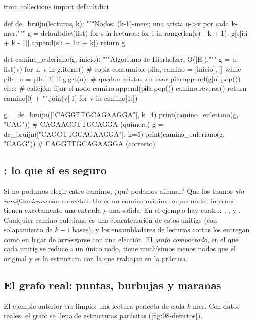 \begin{codigo}[de\_bruijn.py]
from collections import defaultdict

def de_bruijn(lecturas, k):
    """Nodos: (k-1)-mers; una arista u->v por cada k-mer."""
    g = defaultdict(list)
    for s in lecturas:
        for i in range(len(s) - k + 1):
            g[s[i:i + k - 1]].append(s[i + 1:i + k])
    return g

def camino_euleriano(g, inicio):
    """Algoritmo de Hierholzer, O(|E|)."""
    g = {u: list(v) for u, v in g.items()}   # copia consumible
    pila, camino = [inicio], []
    while pila:
        u = pila[-1]
        if g.get(u):                  # quedan aristas sin usar
            pila.append(g[u].pop())
        else:                         # callejón: fijar el nodo
            camino.append(pila.pop())
    camino.reverse()
    return camino[0] + "".join(v[-1] for v in camino[1:])

g = de_bruijn(["CAGGTTGCAGAAGGA"], k=4)
print(camino_euleriano(g, "CAG"))    # CAGAAGGTTGCAGGA  (quimera)
g = de_bruijn(["CAGGTTGCAGAAGGA"], k=5)
print(camino_euleriano(g, "CAGG"))   # CAGGTTGCAGAAGGA  (correcto)
\end{codigo}

\subsection{\texorpdfstring{}{Unitigs}: lo que sí es seguro}

Si no podemos elegir entre caminos, ¿qué podemos afirmar? Que los tramos \emph{sin ramificaciones} son correctos. Un  es un camino máximo cuyos nodos internos tienen exactamente una entrada y una salida. En el ejemplo hay cuatro: , ,  y . Cualquier camino euleriano es una concatenación de estos unitigs (con solapamiento de $k-1$ bases), y los ensambladores de lecturas cortas los entregan como  en lugar de arriesgarse con una elección. El \emph{grafo compactado}, en el que cada unitig se reduce a un único nodo, tiene muchísimos menos nodos que el original y es la estructura con la que trabajan en la práctica.

\subsection{El grafo real: puntas, burbujas y marañas}

El ejemplo anterior era limpio: una lectura perfecta de cada $k$-mer. Con datos reales, el grafo se llena de estructuras parásitas (\cref{fig:08-defectos}).

